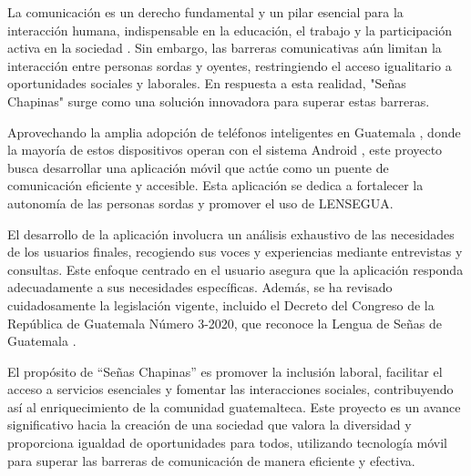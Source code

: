 La comunicación es un derecho fundamental y un pilar esencial para la interacción humana, indispensable en la educación, el trabajo y la participación activa en la sociedad \cite{NacionesUnidas2024}. Sin embargo, las barreras comunicativas aún limitan la interacción entre personas sordas y oyentes, restringiendo el acceso igualitario a oportunidades sociales y laborales. En respuesta a esta realidad, "Señas Chapinas" surge como una solución innovadora para superar estas barreras.

Aprovechando la amplia adopción de teléfonos inteligentes en Guatemala \cite{Xie2023}, donde la mayoría de estos dispositivos operan con el sistema Android \cite{Xie2023}, este proyecto busca desarrollar una aplicación móvil que actúe como un puente de comunicación eficiente y accesible. Esta aplicación se dedica a fortalecer la autonomía de las personas sordas y promover el uso de LENSEGUA.

El desarrollo de la aplicación involucra un análisis exhaustivo de las necesidades de los usuarios finales, recogiendo sus voces y experiencias mediante entrevistas y consultas. Este enfoque centrado en el usuario asegura que la aplicación responda adecuadamente a sus necesidades específicas. Además, se ha revisado cuidadosamente la legislación vigente, incluido el Decreto del Congreso de la República de Guatemala Número 3-2020, que reconoce la Lengua de Señas de Guatemala \cite{CongresoGuatemala2022}.

El propósito de ``Señas Chapinas'' es promover la inclusión laboral, facilitar el acceso a servicios esenciales y fomentar las interacciones sociales, contribuyendo así al enriquecimiento de la comunidad guatemalteca. Este proyecto es un avance significativo hacia la creación de una sociedad que valora la diversidad y proporciona igualdad de oportunidades para todos, utilizando tecnología móvil para superar las barreras de comunicación de manera eficiente y efectiva.
